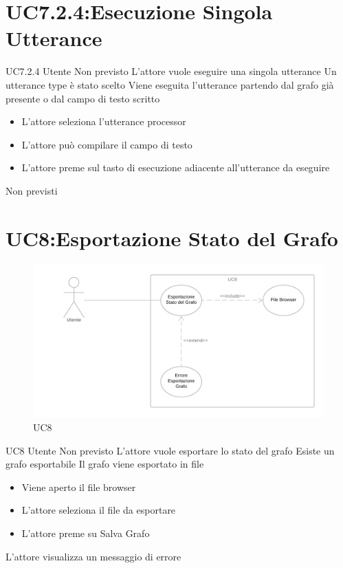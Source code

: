 \documentclass[../AnalisideiRequisiti.tex]{subfiles}
\begin{document}
\section{UC7.2.4:Esecuzione Singola Utterance}
\UserCase
{UC7.2.4}
{Utente}
{Non previsto}
{L'attore vuole eseguire una singola utterance}
{Un utterance type è stato scelto  }
{Viene eseguita l'utterance partendo dal grafo già presente o dal campo di testo scritto}
{
	\begin{itemize}
				\item{} L'attore seleziona l'utterance processor
		\item{} L'attore può compilare il campo di testo
		\item{} L'attore preme sul tasto di esecuzione adiacente all'utterance da eseguire 
	\end{itemize}
}
{Non previsti}

\section{UC8:Esportazione Stato del Grafo}
\begin{figure}[H]
	\caption{UC8}
	\centering
	\includegraphics[width=\textwidth]{../img/UC08.png}
\end{figure}
\UserCase
{UC8}
{Utente}
{Non previsto}
{L'attore vuole esportare lo stato del grafo}
{Esiste un grafo esportabile}
{Il grafo viene esportato in file}
{
	\begin{itemize}
			\item{} Viene aperto il file browser
			\item{} L'attore seleziona il file da esportare
			\item{} L'attore preme su Salva Grafo
	\end{itemize}
}
{L'attore visualizza un messaggio di errore }
\end{document}
